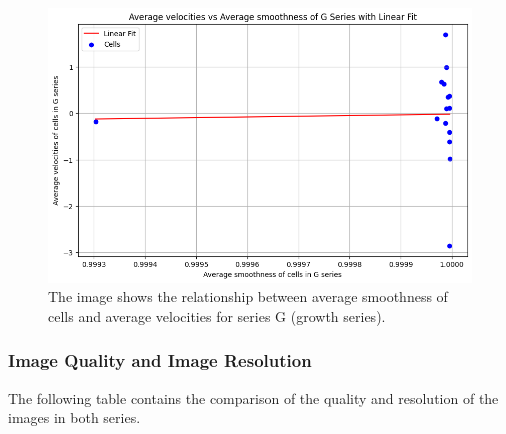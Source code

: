 \documentclass{article}
\begin{document}
\begin{figure}[h!]
\centering
\includegraphics[width=0.75\linewidth]{Report/RImages/Graphs/relationship_s_g.png}
\caption{\label{fig:Mean_Distance}The image shows the relationship between average smoothness of cells and average velocities for series G (growth series).}
\end{figure}
\clearpage
\subsubsection*{Image Quality and Image Resolution}
The following table contains the comparison of the quality and resolution of the images in both series. 
\end{document}

